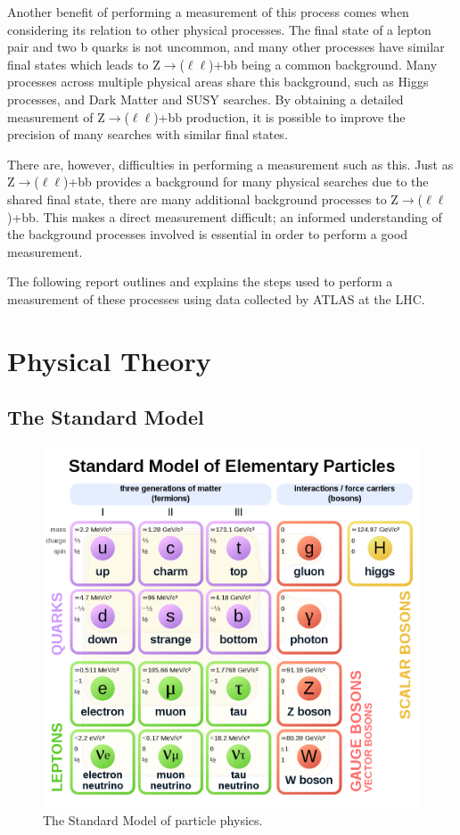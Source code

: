 \documentclass[12pt,a4paper,epsf,portrait,times,epsfig]{article}
\begin{document}
	Another benefit of performing a measurement of this process comes when considering its relation to other physical processes. The final state of a lepton pair and two b quarks is not	uncommon, and many other processes have similar final states which leads to Z$\rightarrow$($\ell\ell$)+bb being a common background. Many processes across multiple physical areas share this background, such as Higgs processes, and Dark Matter and SUSY searches. By obtaining a detailed measurement of Z$\rightarrow$($\ell\ell$)+bb production, it is possible to improve the precision
	of many searches with similar final states. \par

	There are, however, difficulties in performing a measurement such as this. Just as Z$\rightarrow$($\ell\ell$)+bb provides a background for many physical searches due to the shared final state, there are many additional background processes to Z$\rightarrow$($\ell\ell$)+bb. This makes a direct measurement difficult; an informed understanding of the background processes involved is essential in order to perform a good measurement. \par

	The following report outlines and explains the steps used to perform a measurement of these processes using data collected by ATLAS at the LHC.

	\newpage
	
	\section{Physical Theory}
	
	\subsection{The Standard Model}

	\begin{figure}[h!]
		\centering
		\includegraphics[scale=0.3]{Standard_Model.png}
		\caption{The Standard Model of particle physics.}
		\label{Fig:StandardModel} 
	\end{figure}
\end{document}
